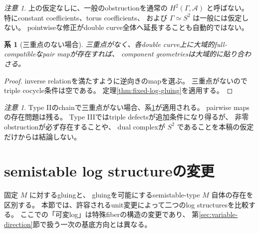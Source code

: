 \documentclass[uplatex,dvipdfmx,11pt]{jsarticle}
\numberwithin{equation}{section}
\theoremstyle{plain}
\newtheorem{corollary}[theorem]{系}
\theoremstyle{definition}
\theoremstyle{remark}
\newtheorem{remark}[theorem]{注意}
\begin{document}
\begin{remark}
\label{rem:abelian-scope}
上の仮定なしに、一般のobstructionを通常の
\(H^2(\Gamma,\mathscr A)\) と呼ばない。
特にconstant coefficients、torus coefficients、
および \(\Gamma\simeq S^2\) は一般には仮定しない。
pointwiseな修正がdouble curve全体へ延長することも自動的ではない。
\end{remark}

\begin{corollary}[三重点のない場合]
\label{cor:no-triple}
三重点がなく、各double curve上に大域的full-compatibleなpair mapが存在すれば、
component geometriesは大域的に貼り合わさる。
\end{corollary}

\begin{proof}
inverse relationを満たすように逆向きのmapを選ぶ。
三重点がないのでtriple cocycle条件は空である。
定理\ref{thm:fixed-log-gluing}を適用する。
\end{proof}

\begin{remark}
\label{rem:type-II-III}
Type IIのchainで三重点がない場合、系\ref{cor:no-triple}が適用される。
pairwise mapsの存在問題は残る。
Type IIIではtriple defectsが追加条件になり得るが、
非零obstructionが必ず存在することや、
dual complexが \(S^2\) であることを本稿の仮定だけからは結論しない。
\end{remark}

\section{semistable log structureの変更}
\label{sec:variable-log}

固定 \(M\) に対するgluingと、
gluingを可能にするsemistable-type \(M\) 自体の存在を区別する。
本節では、許容されるunit変更によって二つのlog structuresを比較する。
ここでの「可変log」は特殊fiberの構造の変更であり、
第\ref{sec:variable-direction}節で扱う一次の基底方向とは異なる。

\end{document}
